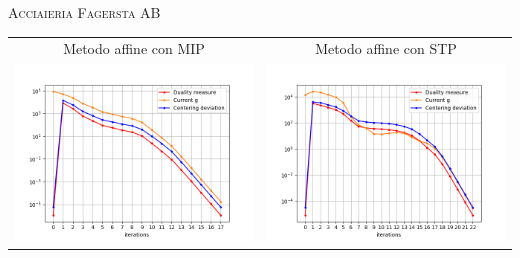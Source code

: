 \begin{frame}{\textsc{\LARGE \textcolor{iris}{Acciaieria Fagersta AB}}}
	\centering
	\begin{tabular}{c@{}c}
		\small{Metodo affine con MIP} & \small{Metodo affine con STP} \\
		\includegraphics[scale = 0.33]{swe_aff1}
		&\includegraphics[scale = 0.33]{swe_aff3}\\ 
	\end{tabular}
\end{frame}

